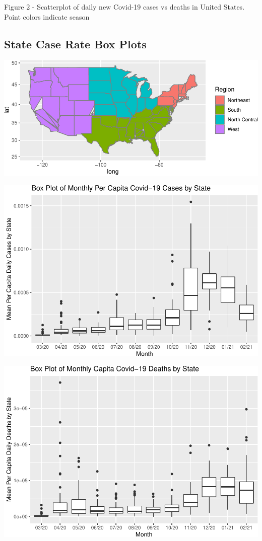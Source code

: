 \documentclass[11pt,]{article}
\begin{document}
\begin{center}
Figure 2 - Scatterplot of daily new Covid-19 cases vs deaths in United States. Point colors indicate season
\end{center}

\hypertarget{state-case-rate-box-plots}{%
\subsection{State Case Rate Box Plots}\label{state-case-rate-box-plots}}

\begin{center}\includegraphics{figs/unnamed-chunk-4} \end{center}

\includegraphics{figs/unnamed-chunk-5.pdf}

\includegraphics{figs/unnamed-chunk-6.pdf}
\end{document}
